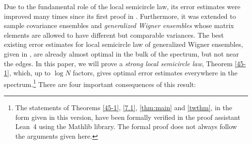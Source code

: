 \documentclass[draft]{article}
\numberwithin{equation}{section}
\numberwithin{theorem}{section}
\numberwithin{definition}{section}
\numberwithin{remark}{section}
\begin{document}
Due to the fundamental role
of the local semicircle law,   its error estimates  were improved many times since its
 first proof in \cite{ESY2}. Furthermore, it was extended to sample 
covariance ensembles \cite{ESYY} 
and  {\it generalized Wigner ensembles} \cite{EYY}  whose matrix elements are allowed to
 have different  but comparable variances.  
The best existing error estimates for local semicircle law of generalized Wigner ensembles, given 
in \cite{EYY2},  are already  almost optimal   in the bulk of the spectrum, but not near 
the edges.   
In this paper, we will prove a {\it strong local semicircle law}, Theorem \ref{45-1},  which, 
up to  $\log N$ factors, gives   optimal error estimates 
 everywhere in the spectrum.\footnote{The statements of Theorems \ref{45-1}, \ref{7.1}, \ref{thm:main}
and \ref{twthm}, in the form given in this version, have been formally verified in the proof assistant
Lean~4 using the Mathlib library. The formal proof does not always follow the arguments given here.}
   There are four important consequences of this result:
\end{document}
